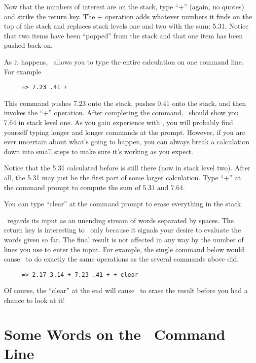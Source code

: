 \documentclass{report}
\begin{document}
Now that the numbers of interest are on the stack, type ``+'' (again, no quotes) and strike the
return key. The + operation adds whatever numbers it finds on the top of the stack and replaces
stack levels one and two with the sum: 5.31. Notice that two items have been ``popped'' from the
stack and that one item has been pushed back on.

As it happens, \CLAC\ allows you to type the entire calculation on one command line. For example

\begin{verbatim}
     => 7.23 .41 +
\end{verbatim}

This command pushes 7.23 onto the stack, pushes 0.41 onto the stack, and then invokes the ``+''
operation. After completing the command, \CLAC\ should show you 7.64 in stack level one. As you
gain experience with \CLAC, you will probably find yourself typing longer and longer commands at
the prompt. However, if you are ever uncertain about what's going to happen, you can always
break a calculation down into small steps to make sure it's working as you expect.

Notice that the 5.31 calculated before is still there (now in stack level two). After all, the
5.31 may just be the first part of some larger calculation. Type ``+'' at the command prompt to
compute the sum of 5.31 and 7.64.

You can type ``clear'' at the command prompt to erase everything in the stack.

\CLAC\ regards its input as an unending stream of words separated by spaces. The return key is
interesting to \CLAC\ only because it signals your desire to evaluate the words given so far.
The final result is not affected in any way by the number of lines you use to enter the input.
For example, the single command below would cause \CLAC\ to do exactly the same operations as
the several commands above did.

\begin{verbatim}
     => 2.17 3.14 + 7.23 .41 + + clear
\end{verbatim}

Of course, the ``clear'' at the end will cause \CLAC\ to erase the result before you had a
chance to look at it!

\section{Some Words on the \CLAC\ Command Line}
\end{document}
